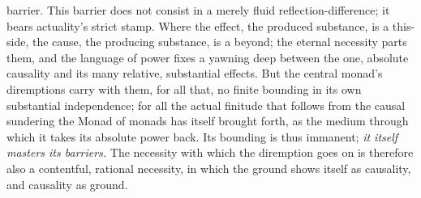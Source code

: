 \documentclass[12pt]{book}
\begin{document}
barrier. This barrier does not consist in a merely fluid
reflection-difference; it bears actuality's strict stamp. Where the effect,
the produced substance, is a this-side, the cause, the producing substance,
is a beyond; the eternal necessity parts them, and the language of power
fixes a yawning deep between the one, absolute causality and its many
relative, substantial effects. But the central monad's diremptions carry
with them, for all that, no finite bounding in its own substantial
independence; for all the actual finitude that follows from the causal
sundering the Monad of monads has itself brought forth, as the medium
through which it takes its absolute power back. Its bounding is thus
immanent; \emph{it itself masters its barriers.} The necessity with which
the diremption goes on is therefore also a contentful, rational necessity,
in which the ground shows itself as causality, and causality as ground.
\end{document}
